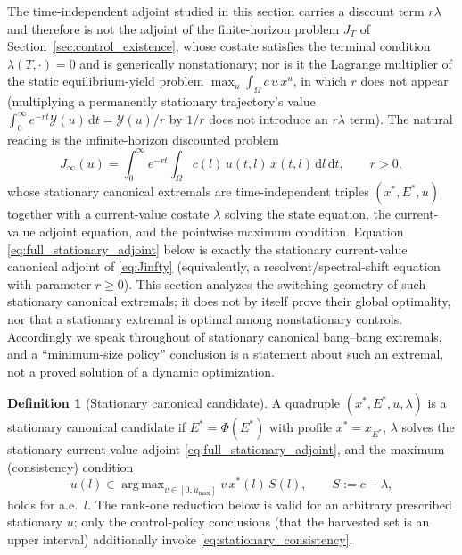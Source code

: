 \documentclass[pdflatex,sn-mathphys-num]{sn-jnl}
\newcommand{\Om}{\Omega}
\newcommand{\dd}{\,\mathrm{d}}
\DeclareMathOperator*{\argmax}{arg\,max}
\theoremstyle{plain}
\theoremstyle{definition}
\newtheorem{definition}[theorem]{Definition}
\theoremstyle{remark}
\begin{document}
The time-independent adjoint studied in this section carries a discount term
$r\lambda$ and therefore is not the adjoint of the finite-horizon problem
$J_T$ of Section~\ref{sec:control_existence}, whose costate satisfies the terminal
condition $\lambda(T,\cdot)=0$ and is generically nonstationary; nor is it the
Lagrange multiplier of the static equilibrium-yield problem
$\max_u\int_\Om c\,u\,x^u$, in which $r$ does not appear (multiplying a permanently
stationary trajectory's value $\int_0^\infty e^{-rt}\mathcal Y(u)\dd t=\mathcal
Y(u)/r$ by $1/r$ does not introduce an $r\lambda$ term). The natural reading is the
infinite-horizon discounted problem
\begin{equation}\label{eq:Jinfty}
J_\infty(u)=\int_0^\infty e^{-rt}\int_\Om c(l)\,u(t,l)\,x(t,l)\dd l\dd t,
\qquad r>0,
\end{equation}
whose stationary canonical extremals are time-independent triples
$(x^*,E^*,u)$ together with a current-value costate $\lambda$ solving the state
equation, the current-value adjoint equation, and the pointwise maximum condition.
Equation \eqref{eq:full_stationary_adjoint} below is exactly the stationary
current-value canonical adjoint of \eqref{eq:Jinfty} (equivalently, a
resolvent/spectral-shift equation with parameter $r\ge0$). This section analyzes
the switching geometry of such stationary canonical extremals; it does not
by itself prove their global optimality, nor that a stationary extremal is optimal
among nonstationary controls. Accordingly we speak throughout of stationary
canonical bang--bang extremals, and a ``minimum-size policy'' conclusion is a
statement about such an extremal, not a proved solution of a dynamic optimization.

\begin{definition}[Stationary canonical candidate]
\label{def:canonical_candidate}
A quadruple $(x^*,E^*,u,\lambda)$ is a stationary canonical candidate if
$E^*=\Phi(E^*)$ with profile $x^*=x_{E^*}$, $\lambda$ solves the stationary
current-value adjoint \eqref{eq:full_stationary_adjoint}, and the maximum
(consistency) condition
\begin{equation}\label{eq:stationary_consistency}
u(l)\in\argmax_{v\in[0,u_{\max}]}v\,x^*(l)\,S(l),
\qquad S:=c-\lambda,
\end{equation}
holds for a.e.\ $l$. The rank-one reduction below is valid for an
arbitrary prescribed stationary $u$; only the control-policy conclusions
(that the harvested set is an upper interval) additionally invoke
\eqref{eq:stationary_consistency}.
\end{definition}
\end{document}
